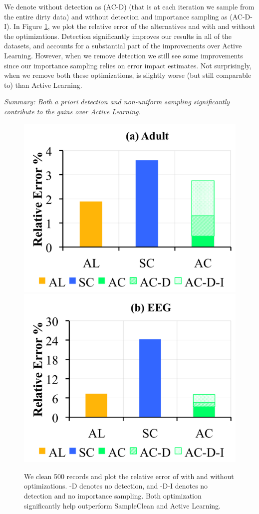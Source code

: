 We denote \sys without detection as (AC-D) (that is at each iteration we sample from the entire dirty data) and \sys without detection and importance sampling as (AC-D-I).
In Figure \ref{opts}, we plot the relative error of the alternatives and \sys with and without the optimizations.
Detection significantly improves our results in all of the datasets, and accounts for a substantial part of the improvements over Active Learning.
However, when we remove detection we still see some improvements since our importance sampling relies on error impact estimates.
Not surprisingly, when we remove both these optimizations, \sys is slightly worse (but still comparable to) than Active Learning.

\vspace{0.25em}

\noindent \emph{Summary: Both a priori detection and non-uniform sampling significantly contribute to the gains over Active Learning.}

\begin{figure}[ht!]
\centering
 \includegraphics[width=0.49\columnwidth]{exp/exp8a.png}
 \includegraphics[width=0.49\columnwidth]{exp/exp8b.png}
 \caption{We clean 500 records and plot the relative error of \sys with and without optimizations. -D denotes no detection, and -D-I denotes no detection and no importance sampling. Both optimization significantly help \sys outperform SampleClean and Active Learning. \label{opts}}
\end{figure}


